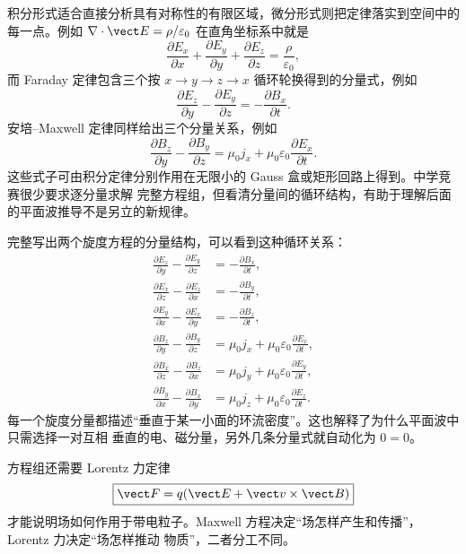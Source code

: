 积分形式适合直接分析具有对称性的有限区域，微分形式则把定律落实到空间中的每一点。例如
$\nabla\cdot\vect E=\rho/\varepsilon_0$ 在直角坐标系中就是
\begin{equation}
  \frac{\partial E_x}{\partial x}+\frac{\partial E_y}{\partial y}
  +\frac{\partial E_z}{\partial z}=\frac{\rho}{\varepsilon_0},
\end{equation}
而 Faraday 定律包含三个按 $x\to y\to z\to x$ 循环轮换得到的分量式，例如
\begin{equation}
  \frac{\partial E_z}{\partial y}-\frac{\partial E_y}{\partial z}
  =-\frac{\partial B_x}{\partial t}.
\end{equation}
安培--Maxwell 定律同样给出三个分量关系，例如
\begin{equation}
  \frac{\partial B_z}{\partial y}-\frac{\partial B_y}{\partial z}
  =\mu_0j_x+\mu_0\varepsilon_0\frac{\partial E_x}{\partial t}.
\end{equation}
这些式子可由积分定律分别作用在无限小的 Gauss 盒或矩形回路上得到。中学竞赛很少要求逐分量求解
完整方程组，但看清分量间的循环结构，有助于理解后面的平面波推导不是另立的新规律。

完整写出两个旋度方程的分量结构，可以看到这种循环关系：
\begin{align}
 \frac{\partial E_z}{\partial y}-\frac{\partial E_y}{\partial z}
   &=-\frac{\partial B_x}{\partial t},\\
 \frac{\partial E_x}{\partial z}-\frac{\partial E_z}{\partial x}
   &=-\frac{\partial B_y}{\partial t},\\
 \frac{\partial E_y}{\partial x}-\frac{\partial E_x}{\partial y}
   &=-\frac{\partial B_z}{\partial t},\\
 \frac{\partial B_z}{\partial y}-\frac{\partial B_y}{\partial z}
   &=\mu_0j_x+\mu_0\varepsilon_0\frac{\partial E_x}{\partial t},\\
 \frac{\partial B_x}{\partial z}-\frac{\partial B_z}{\partial x}
   &=\mu_0j_y+\mu_0\varepsilon_0\frac{\partial E_y}{\partial t},\\
 \frac{\partial B_y}{\partial x}-\frac{\partial B_x}{\partial y}
   &=\mu_0j_z+\mu_0\varepsilon_0\frac{\partial E_z}{\partial t}.
\end{align}
每一个旋度分量都描述“垂直于某一小面的环流密度”。这也解释了为什么平面波中只需选择一对互相
垂直的电、磁分量，另外几条分量式就自动化为 $0=0$。

方程组还需要 Lorentz 力定律
\begin{equation}
  \boxed{\vect F=q(\vect E+\vect v\times\vect B)}
\end{equation}
才能说明场如何作用于带电粒子。Maxwell 方程决定“场怎样产生和传播”，Lorentz 力决定“场怎样推动
物质”，二者分工不同。

